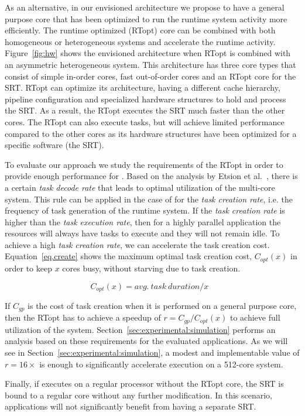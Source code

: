 As an alternative, in our envisioned architecture we propose to have a general purpose core that has been optimized to run the runtime system activity more efficiently. 
The runtime optimized (RTopt) core can be combined with both homogeneous or heterogeneous systems and accelerate the runtime activity.
Figure~\ref{fig:hw} shows the envisioned architecture when RTopt is combined with an asymmetric heterogeneous system.
This architecture has three core types that consist of simple in-order cores, fast out-of-order cores and an RTopt core for the SRT. 
RTopt can optimize its architecture, having a different cache hierarchy, pipeline configuration and specialized hardware structures to hold and process the SRT. 
As a result, the RTopt executes the SRT much faster than the other cores. 
The RTopt can also execute tasks, but will achieve limited performance compared to the other cores as its hardware structures have been optimized for a specific software (the SRT).

To evaluate our approach we study the requirements of the RTopt in order to provide enough performance for {\proposal}.
Based on the analysis by Etsion et al.~\cite{TaskSS}, there is a certain \textit{task decode rate} that leads to optimal utilization of the multi-core system.
This rule can be applied in the case of {\proposal} for the \textit{task creation rate}, i.e. the frequency of task generation of the runtime system.
If the \textit{task creation rate} is higher than the \textit{task execution rate}, then for a highly parallel application the resources will always have tasks to execute and they will not remain idle.
To achieve a high \textit{task creation rate}, we can accelerate the task creation cost.
Equation~\ref{eq.create} shows the maximum optimal task creation cost, $C_{opt}(x)$ in order to keep $x$ cores busy, without starving due to task creation.

\begingroup\makeatletter{}\check@mathfonts
\begin{equation}
  \text{$C_{opt}(x) = avg.\ task\ duration / x$ }
\label{eq.create}
\end{equation}
\endgroup

If $C_{gp}$ is the cost of task creation when it is performed on a general purpose core, then the RTopt has to achieve a speedup of $r = C_{gp}/C_{opt}(x)$ to achieve full utilization of the system. 
Section~\ref{sec:experimental:simulation} performs an analysis based on these requirements for the evaluated applications. 
As we will see in Section~\ref{sec:experimental:simulation}, a modest and implementable value of $r=16\times$ is enough to significantly accelerate execution on a 512-core system.

Finally, if {\proposal} executes on a regular processor without the RTopt core, the SRT is bound to a regular core without any further modification. In this scenario, applications will not significantly benefit from having a separate SRT.



